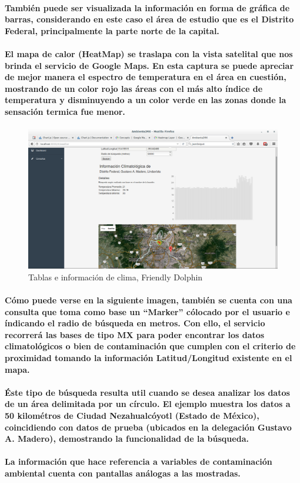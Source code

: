     \paragraph{También puede ser visualizada la información en forma de gráfica de barras, considerando en este caso el área de estudio que es el Distrito Federal, principalmente la parte norte de la capital.}
    \paragraph{El mapa de calor (HeatMap) se traslapa con la vista satelital que nos brinda el servicio de Google Maps. En esta captura se puede apreciar de mejor manera el espectro de temperatura en el área en cuestión, mostrando de un color rojo las áreas con el más alto índice de temperatura y disminuyendo a un color verde en las zonas donde la sensación termica fue menor.}
    \begin{figure}[b!]
      \centering
        \includegraphics[width=\textwidth]{./images/CapturaFriendlyDolphin3}
      \caption{Tablas e información de clima, Friendly Dolphin}
    \end{figure}
    \paragraph{Cómo puede verse en la siguiente imagen, también se cuenta con una consulta que toma como base un ``Marker'' cólocado por el usuario e índicando el radio de búsqueda en metros. Con ello, el servicio recorrerá las bases de tipo MX para poder encontrar los datos climatológicos o bien de contaminación que cumplen con el criterio de proximidad tomando la información Latitud/Longitud existente en el mapa.}
    \paragraph{Éste tipo de búsqueda resulta util cuando se desea analizar los datos de un área delimitada por un círculo. El ejemplo muestra los datos a 50 kilométros de Ciudad Nezahualcóyotl (Estado de México), coincidiendo con datos de prueba (ubicados en la delegación Gustavo A. Madero), demostrando la funcionalidad de la búsqueda.}
    \paragraph{La información que hace referencia a variables de contaminación ambiental cuenta con pantallas análogas a las mostradas.}
